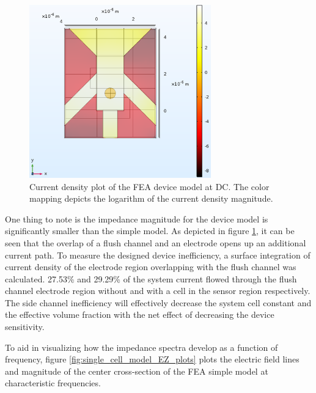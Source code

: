 \begin{figure}[H]
    \centering
    \includegraphics[width=0.7\textwidth]{images/deviceCellCurrent1Hz.png}
    \caption[Current density plot of the FEA device model.]{Current density plot of the FEA device model at DC. The color mapping depicts the logarithm of the current density magnitude.}
    \label{fig:device_current_denisty plot}
\end{figure}

\par One thing to note is the impedance magnitude for the device model is significantly smaller than the simple model. As depicted in figure \ref{fig:device_current_denisty plot}, it can be seen that the overlap of a flush channel and an electrode opens up an additional current path. To measure the designed device inefficiency, a surface integration of current density of the electrode region overlapping with the flush channel was calculated. 27.53\% and 29.29\% of the system current flowed through the flush channel electrode region without and with a cell in the sensor region respectively. The side channel inefficiency will effectively decrease the system cell constant and the effective volume fraction with the net effect of decreasing the device sensitivity.

\par To aid in visualizing how the impedance spectra develop as a function of frequency, figure \ref{fig:single_cell_model_EZ_plots} plots the electric field lines and magnitude of the center cross-section of the FEA simple model at characteristic frequencies.

